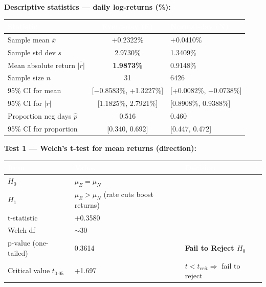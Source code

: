 \documentclass[12pt,a4paper]{article}
\begin{document}
\textbf{Descriptive statistics --- daily log-returns (\%):}
\begin{table}[H]
\centering
\begin{tabularx}{\textwidth}{|l|c|X|}
\hline
\rowcolor{hdrbg} \textcolor{white}{\textbf{Statistic}} & \textcolor{white}{\textbf{Event-day (E)}} & \textcolor{white}{\textbf{Normal-day (N)}} \\
\hline
Sample mean $\bar{x}$ & +0.2322\% & +0.0410\% \\
\hline
\rowcolor{rowalt}
Sample std dev $s$ & 2.9730\% & 1.3409\% \\
\hline
Mean absolute return $\overline{|r|}$ & \textbf{1.9873\%} & 0.9148\% \\
\hline
\rowcolor{rowalt}
Sample size $n$ & 31 & 6426 \\
\hline
95\% CI for mean & [$-$0.8583\%, +1.3227\%] & [+0.0082\%, +0.0738\%] \\
\hline
\rowcolor{rowalt}
95\% CI for $\overline{|r|}$ & [1.1825\%, 2.7921\%] & [0.8908\%, 0.9388\%] \\
\hline
Proportion neg days $\hat{p}$ & 0.516 & 0.460 \\
\hline
\rowcolor{rowalt}
95\% CI for proportion & [0.340, 0.692] & [0.447, 0.472] \\
\hline
\end{tabularx}
\end{table}

\vspace{1em}
\textbf{Test 1 --- Welch's t-test for mean returns (direction):}
\begin{table}[H]
\centering
\begin{tabularx}{\textwidth}{|l|l|X|}
\hline
\rowcolor{hdrbg} \textcolor{white}{\textbf{Item}} & \textcolor{white}{\textbf{Value}} & \textcolor{white}{\textbf{Decision}} \\
\hline
$H_0$ & $\mu_E = \mu_N$ & \\
\hline
\rowcolor{rowalt}
$H_1$ & $\mu_E > \mu_N$ (rate cuts boost returns) & \\
\hline
t-statistic & +0.3580 & \\
\hline
\rowcolor{rowalt}
Welch df & $\sim$30 & \\
\hline
p-value (one-tailed) & 0.3614 & \textbf{Fail to Reject $H_0$} \\
\hline
\rowcolor{rowalt}
Critical value $t_{0.05}$ & +1.697 & $t < t_{crit} \Rightarrow$ fail to reject \\
\hline
\end{tabularx}
\end{table}
\end{document}
